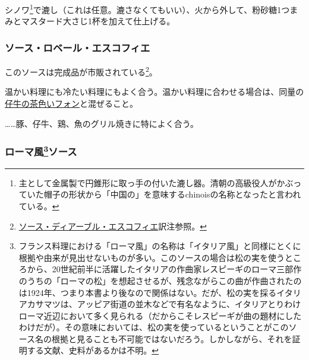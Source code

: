 \begin{recette}
シノワ\footnote{主として金属製で円錐形に取っ手の付いた漉し器。清朝の高級役人がかぶっていた帽子の形状から「中国の」を意味するchinoisの名称となったと言われている。}で漉し（これは任意。漉さなくてもいい）、火から外して、粉砂糖1つまみとマスタード大さじ1杯を加えて仕上げる。

\hypertarget{sauce-robert-escoffier}{%
\subsubsection{ソース・ロベール・エスコフィエ}\label{sauce-robert-escoffier}}



このソースは完成品が市販されている\footnote{\protect\hyperlink{sauce-diable-escoffier}{ソース・ディアーブル・エスコフィエ}訳注参照。}。

温かい料理にも冷たい料理にもよく合う。温かい料理に合わせる場合は、同量の\protect\hyperlink{jus-de-veau-brun}{仔牛の茶色いフォン}と混ぜること。

\ldots{}\ldots{}豚、仔牛、鶏、魚のグリル焼きに特によく合う。

\hypertarget{sauce-romaine}{%
\subsubsection[ローマ風ソース]{\texorpdfstring{ローマ風\footnote{フランス料理における「ローマ風」の名称は「イタリア風」と同様にとくに根拠や由来が見出せないものが多い。このソースの場合は松の実を使うところから、20世紀前半に活躍したイタリアの作曲家レスピーギのローマ三部作のうちの「ローマの松」を想起させるが、残念ながらこの曲が作曲されたのは1924年、つまり本書より後なので関係はない。だが、松の実を採るイタリアカサマツは、アッピア街道の並木などで有名なように、イタリアとりわけローマ近辺において多く見られる（だからこそレスピーギが曲の題材にしたわけだが）。その意味においては、松の実を使っているということがこのソース名の根拠と見ることも不可能ではないだろう。しかしながら、それを証明する文献、史料があるかは不明。}ソース}{ローマ風ソース}}\label{sauce-romaine}}




\end{recette}
